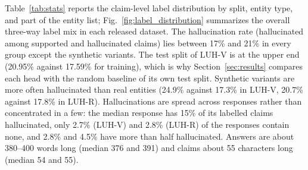 \documentclass[conference,a4paper]{IEEEtran}
\begin{document}
Table~\ref{tab:stats} reports the claim-level label distribution by split, entity type, and part of the entity list; Fig.~\ref{fig:label_distribution} summarizes the overall three-way label mix in each released dataset. The hallucination rate (hallucinated among supported and hallucinated claims) lies between 17\% and 21\% in every group except the synthetic variants. The test split of LUH-V is at the upper end (20.95\% against 17.59\% for training), which is why Section~\ref{sec:results} compares each head with the random baseline of its own test split. Synthetic variants are more often hallucinated than real entities (24.9\% against 17.3\% in LUH-V, 20.7\% against 17.8\% in LUH-R). Hallucinations are spread across responses rather than concentrated in a few: the median response has 15\% of its labelled claims hallucinated, only 2.7\% (LUH-V) and 2.8\% (LUH-R) of the responses contain none, and 2.8\% and 4.5\% have more than half hallucinated. Answers are about 380--400 words long (median 376 and 391) and claims about 55 characters long (median 54 and 55).
\end{document}
